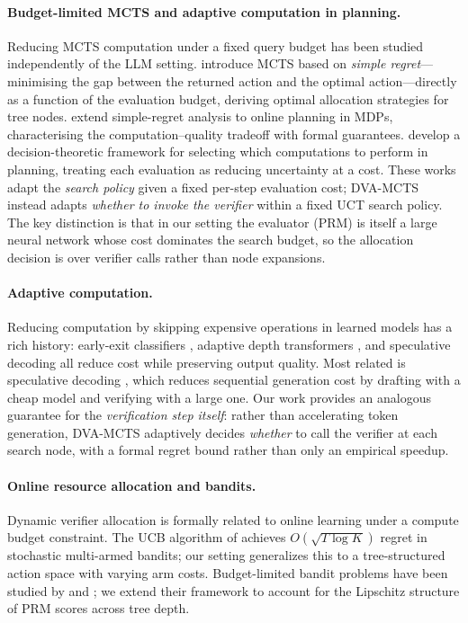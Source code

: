 \paragraph{Budget-limited MCTS and adaptive computation in planning.}
Reducing MCTS computation under a fixed query budget has been studied independently
of the LLM setting.
\citet{tolpin2012mcts} introduce MCTS based on \emph{simple regret}---minimising the
gap between the returned action and the optimal action---directly as a function of
the evaluation budget, deriving optimal allocation strategies for tree nodes.
\citet{feldman2014simple} extend simple-regret analysis to online planning in MDPs,
characterising the computation--quality tradeoff with formal guarantees.
\citet{hay2012selecting} develop a decision-theoretic framework for selecting which
computations to perform in planning, treating each evaluation as reducing uncertainty
at a cost.
These works adapt the \emph{search policy} given a fixed per-step evaluation cost;
DVA-MCTS instead adapts \emph{whether to invoke the verifier} within a fixed UCT
search policy.
The key distinction is that in our setting the evaluator (PRM) is itself a large
neural network whose cost dominates the search budget, so the allocation decision
is over verifier calls rather than node expansions.

\paragraph{Adaptive computation.}
Reducing computation by skipping expensive operations in learned models has a rich
history: early-exit classifiers \citep{teerapittayanon2016branchynet}, adaptive depth
transformers \citep{graves2016adaptive,elbayad2020depth}, and speculative decoding
\citep{leviathan2023fast} all reduce cost while preserving output quality.
Most related is speculative decoding \citep{leviathan2023fast}, which reduces
sequential generation cost by drafting with a cheap model and verifying with a large
one.  Our work provides an analogous guarantee for the \emph{verification step
itself}: rather than accelerating token generation, DVA-MCTS adaptively decides
\emph{whether} to call the verifier at each search node, with a formal regret
bound rather than only an empirical speedup.

\paragraph{Online resource allocation and bandits.}
Dynamic verifier allocation is formally related to online learning under a compute
budget constraint. The UCB algorithm of \citet{auer2002finite} achieves
$O(\sqrt{T \log K})$ regret in stochastic multi-armed bandits; our setting generalizes
this to a tree-structured action space with varying arm costs. Budget-limited bandit
problems have been studied by \citet{badanidiyuru2013bandits} and
\citet{combes2015bandits}; we extend their framework to account for the Lipschitz
structure of PRM scores across tree depth.

